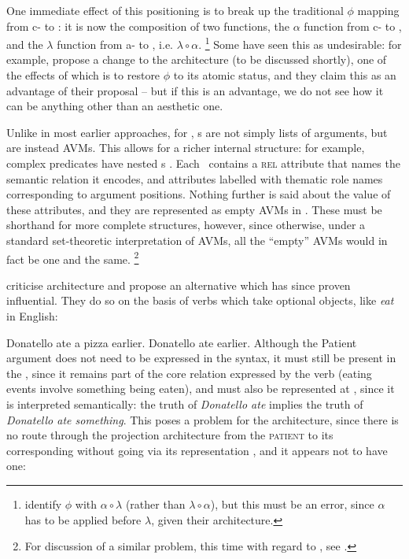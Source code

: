 \documentclass[output=paper]{langscibook}
\begin{document}
One immediate effect of this positioning is to break up the traditional $\phi$
mapping from c- to \fstruc{}: it is now the composition of two functions, the
$\alpha$ function from c- to \astruc{}, and the $\lambda$ function from a- to
\fstruc{}, i.e. $\lambda \circ \alpha$.%
%
\footnote{\citet[1]{butt1997architecture} identify $\phi$ with
  $\alpha \circ \lambda$ (rather than $\lambda \circ \alpha$), but this must be
  an error, since $\alpha$ has to be applied before $\lambda$, given their
  architecture.}
%
Some have seen this as undesirable: for example, \citet{AsudGior12} propose a
change to the architecture (to be discussed shortly), one of the effects of
which is to restore $\phi$ to its atomic status, and they claim this as an
advantage of their proposal \citep[71]{AsudGior12} -- but if this is an
advantage, we do not see how it can be anything other than an aesthetic one.

Unlike in most earlier approaches, for \citet{butt1997architecture}, \astruc s
are not simply lists of arguments, but are instead AVMs. This allows for a
richer internal structure: for example, complex predicates have nested \astruc s
\citep[12]{butt1997architecture}. Each \astruc\ contains a \textsc{rel}
attribute that names the semantic relation it encodes, and attributes labelled
with thematic role names corresponding to argument positions. Nothing further is
said about the value of these attributes, and they are represented as empty AVMs
in \citet{butt1997architecture}. These must be shorthand for more complete
structures, however, since otherwise, under a standard set-theoretic
interpretation of AVMs, all the ``empty'' AVMs would in fact be one and the
same.%
%
\footnote{For discussion of a similar problem, this time with regard to
  \sstruc, see \citet[348--353]{findlay2021}.}
%

\citet{AsudGior12} criticise  architecture and
propose an alternative which has since proven influential. They do so on the
basis of verbs which take optional objects, like \textit{eat} in English:

\ea\label{ex:optional-object-pair}
\ea Donatello ate a pizza earlier.
\ex Donatello ate earlier.
\z
\z
%
Although the Patient argument does not need to be expressed in the syntax, it
must still be present in the \astruc, since it remains part of the core relation
expressed by the verb (eating events involve something being eaten), and must
also be represented at \sstruc, since it is interpreted semantically: the truth
of \textit{Donatello ate} implies the truth of \textit{Donatello ate something}.
This poses a problem for the \citet{butt1997architecture} architecture, since
there is no route through the projection architecture from the \astruc{}
\textsc{patient} to its corresponding \sstruc{} without going via its \fstruc{}
representation%
, and it appears not to have one:
\end{document}
